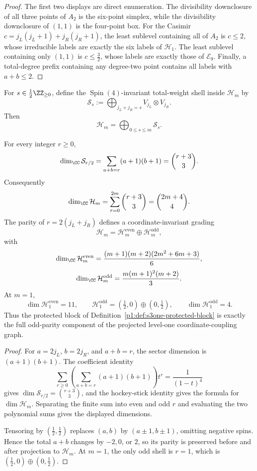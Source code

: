 \documentclass[11pt]{article}
\begin{document}
\begin{proof}
The first two displays are direct enumeration.  The divisibility downclosure
of all three points of \(A_2\) is the six-point simplex, while the
divisibility downclosure of \((1,1)\) is the four-point box.  For the Casimir
\(c=j_L(j_L+1)+j_R(j_R+1)\), the least sublevel containing all of \(A_2\) is
\(c\le2\), whose irreducible labels are exactly the six labels of
\(\mathcal H_1\).  The least sublevel containing only \((1,1)\) is
\(c\le\tfrac32\), whose labels are exactly those of \(\mathcal E_9\).
Finally, a total-degree prefix containing any degree-two point contains all
labels with \(a+b\le2\).
\end{proof}

\begin{definition}
\label{p1:def:total-weight-shell-filtration}
For \(s\in\frac12\ZZ_{\ge0}\), define the \(\operatorname{Spin}(4)\)-invariant total-weight
shell inside \(\mathcal H_m\) by
\[
\mathcal S_s:=
\bigoplus_{j_L+j_R=s}V_{j_L}\otimes V_{j_R}.
\]
Then
\[
\mathcal H_m=
\bigoplus_{0\le s\le m}\mathcal S_s.
\]
\end{definition}

\begin{proposition}
\label{p1:prop:shell-dimensions-parity}
For every integer \(r\ge0\),
\[
    \dim_\CC\mathcal S_{r/2}
    =\sum_{a+b=r}(a+1)(b+1)
    =\binom{r+3}{3}.
\]
Consequently
\[
    \dim_\CC\mathcal H_m
    =\sum_{r=0}^{2m}\binom{r+3}{3}
    =\binom{2m+4}{4}.
\]
The parity of \(r=2(j_L+j_R)\) defines a coordinate-invariant grading
\[
    \mathcal H_m
    =\mathcal H_m^{\mathrm{even}}
     \oplus\mathcal H_m^{\mathrm{odd}},
\]
with
\[
\dim_\CC\mathcal H_m^{\mathrm{even}}
=\frac{(m+1)(m+2)(2m^2+6m+3)}6,
\]
\[
\dim_\CC\mathcal H_m^{\mathrm{odd}}
=\frac{m(m+1)^2(m+2)}3.
\]
At \(m=1\),
\[
    \dim\mathcal H_1^{\mathrm{even}}=11,
    \qquad
    \mathcal H_1^{\mathrm{odd}}
    =(\tfrac12,0)\oplus(0,\tfrac12),
    \qquad
    \dim\mathcal H_1^{\mathrm{odd}}=4.
\]
Thus the protected block of
Definition~\ref{p1:def:s3one-protected-block} is exactly the full odd-parity
component of the projected level-one coordinate-coupling graph.
\end{proposition}

\begin{proof}
For \(a=2j_L\), \(b=2j_R\), and \(a+b=r\), the sector dimension is
\((a+1)(b+1)\).  The coefficient identity
\[
    \sum_{r\ge0}\left(\sum_{a+b=r}(a+1)(b+1)\right)t^r
    =\frac1{(1-t)^4}
\]
gives \(\dim\mathcal S_{r/2}=\binom{r+3}{3}\), and the hockey-stick identity
gives the formula for \(\dim\mathcal H_m\).  Separating the finite sum into
even and odd \(r\) and evaluating the two polynomial sums gives the displayed
dimensions.

Tensoring by \((\tfrac12,\tfrac12)\) replaces \((a,b)\) by
\((a\pm1,b\pm1)\), omitting negative spins.  Hence the total \(a+b\) changes
by \(-2,0\), or \(2\), so its parity is preserved before and after projection
to \(\mathcal H_m\).  At \(m=1\), the only odd shell is \(r=1\), which is
\((\tfrac12,0)\oplus(0,\tfrac12)\).
\end{proof}
\end{document}
